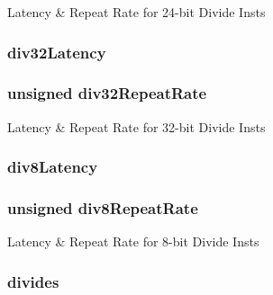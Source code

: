 \label{classMultDivUnit_a0e2f13b87db0c3e86b59d16cfb2ed40c}
Latency \& Repeat Rate for 24-\/bit Divide Insts \hypertarget{classMultDivUnit_abbe7306bdfa2d1da4d51db2c3618214d}{
\subsubsection[{div32Latency}]{ {\bf div32Latency}}}
\label{classMultDivUnit_abbe7306bdfa2d1da4d51db2c3618214d}
\hypertarget{classMultDivUnit_aa536f733081397edefcc94501c5e79a6}{
\subsubsection[{div32RepeatRate}]{\setlength{\rightskip}{0pt plus 5cm}unsigned {\bf div32RepeatRate}}}
\label{classMultDivUnit_aa536f733081397edefcc94501c5e79a6}
Latency \& Repeat Rate for 32-\/bit Divide Insts \hypertarget{classMultDivUnit_abec03f1964c506077d736637cceae467}{
\subsubsection[{div8Latency}]{ {\bf div8Latency}}}
\label{classMultDivUnit_abec03f1964c506077d736637cceae467}
\hypertarget{classMultDivUnit_a91461263fab8dd281b183c701f4cbbe1}{
\subsubsection[{div8RepeatRate}]{\setlength{\rightskip}{0pt plus 5cm}unsigned {\bf div8RepeatRate}}}
\label{classMultDivUnit_a91461263fab8dd281b183c701f4cbbe1}
Latency \& Repeat Rate for 8-\/bit Divide Insts \hypertarget{classMultDivUnit_af00ce09d1fb90b720ca50018e34ad41b}{
\subsubsection[{divides}]{ {\bf divides}}}
